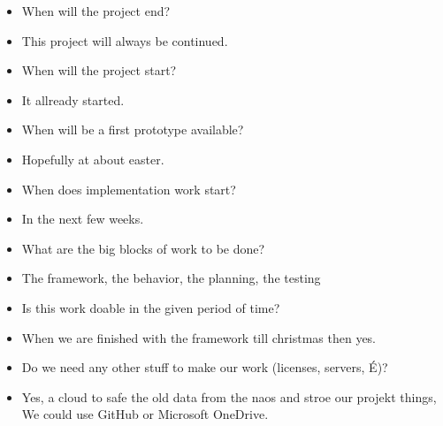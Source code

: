 \documentclass[12pt]{article}
\theoremstyle{definition}
\begin{document}
\begin{itemize}
\item When will the project end?
\item This project will always be continued.
\item When will the project start?
\item It allready started.
\item When will be a first prototype available?
\item Hopefully at about easter.
\item When does implementation work start?
\item In the next few weeks.
\item What are the big blocks of work to be done?
\item The framework, the behavior, the planning, the testing
\item Is this work doable in the given period of time?
\item When we are finished with the framework till christmas then yes.
\item Do we need any other stuff to make our work (licenses, servers, É)?
\item Yes, a cloud to safe the old data from the naos and stroe our projekt things, We could use GitHub or Microsoft OneDrive.
\end{itemize}
\end{document}
